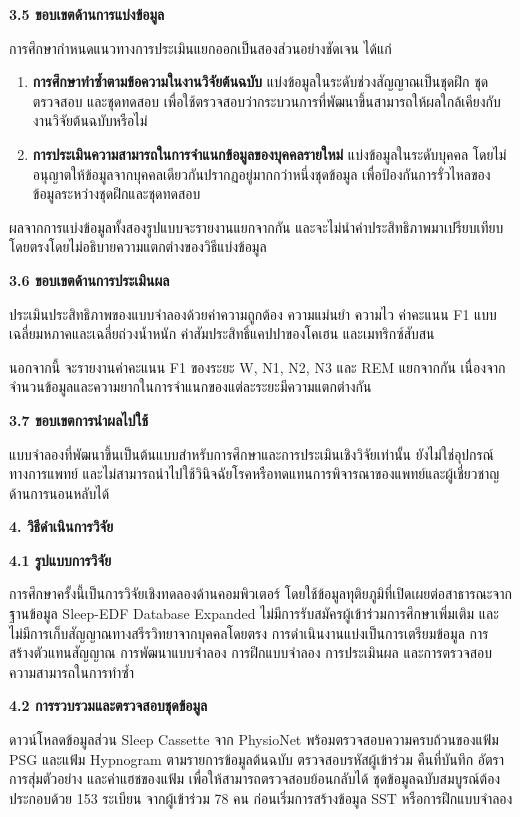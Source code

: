 \documentclass[12pt,a4paper]{article}
\newcommand{\mainsection}[1]{%
  \par\vspace{0.65\baselineskip}%
  \noindent\textbf{#1}\par\nobreak\vspace{0.2\baselineskip}%
}
\newcommand{\subsectionthai}[1]{%
  \par\vspace{0.35\baselineskip}%
  \noindent\textbf{#1}\par\nobreak\vspace{0.1\baselineskip}%
}
\begin{document}
\subsectionthai{3.5 ขอบเขตด้านการแบ่งข้อมูล}

การศึกษากำหนดแนวทางการประเมินแยกออกเป็นสองส่วนอย่างชัดเจน ได้แก่

\begin{enumerate}[label=\arabic*.]
  \item \textbf{การศึกษาทำซ้ำตามข้อความในงานวิจัยต้นฉบับ} แบ่งข้อมูลในระดับช่วงสัญญาณเป็นชุดฝึก ชุดตรวจสอบ และชุดทดสอบ เพื่อใช้ตรวจสอบว่ากระบวนการที่พัฒนาขึ้นสามารถให้ผลใกล้เคียงกับงานวิจัยต้นฉบับหรือไม่
  \item \textbf{การประเมินความสามารถในการจำแนกข้อมูลของบุคคลรายใหม่} แบ่งข้อมูลในระดับบุคคล โดยไม่อนุญาตให้ข้อมูลจากบุคคลเดียวกันปรากฏอยู่มากกว่าหนึ่งชุดข้อมูล เพื่อป้องกันการรั่วไหลของข้อมูลระหว่างชุดฝึกและชุดทดสอบ
\end{enumerate}

ผลจากการแบ่งข้อมูลทั้งสองรูปแบบจะรายงานแยกจากกัน และจะไม่นำค่าประสิทธิภาพมาเปรียบเทียบโดยตรงโดยไม่อธิบายความแตกต่างของวิธีแบ่งข้อมูล

\subsectionthai{3.6 ขอบเขตด้านการประเมินผล}

ประเมินประสิทธิภาพของแบบจำลองด้วยค่าความถูกต้อง ความแม่นยำ ความไว ค่าคะแนน F1 แบบเฉลี่ยมหภาคและเฉลี่ยถ่วงน้ำหนัก ค่าสัมประสิทธิ์แคปปาของโคเฮน และเมทริกซ์สับสน

นอกจากนี้ จะรายงานค่าคะแนน F1 ของระยะ W, N1, N2, N3 และ REM แยกจากกัน เนื่องจากจำนวนข้อมูลและความยากในการจำแนกของแต่ละระยะมีความแตกต่างกัน

\subsectionthai{3.7 ขอบเขตการนำผลไปใช้}

แบบจำลองที่พัฒนาขึ้นเป็นต้นแบบสำหรับการศึกษาและการประเมินเชิงวิจัยเท่านั้น ยังไม่ใช่อุปกรณ์ทางการแพทย์ และไม่สามารถนำไปใช้วินิจฉัยโรคหรือทดแทนการพิจารณาของแพทย์และผู้เชี่ยวชาญด้านการนอนหลับได้

\mainsection{4. วิธีดำเนินการวิจัย}

\subsectionthai{4.1 รูปแบบการวิจัย}

การศึกษาครั้งนี้เป็นการวิจัยเชิงทดลองด้านคอมพิวเตอร์ โดยใช้ข้อมูลทุติยภูมิที่เปิดเผยต่อสาธารณะจากฐานข้อมูล Sleep-EDF Database Expanded ไม่มีการรับสมัครผู้เข้าร่วมการศึกษาเพิ่มเติม และไม่มีการเก็บสัญญาณทางสรีรวิทยาจากบุคคลโดยตรง การดำเนินงานแบ่งเป็นการเตรียมข้อมูล การสร้างตัวแทนสัญญาณ การพัฒนาแบบจำลอง การฝึกแบบจำลอง การประเมินผล และการตรวจสอบความสามารถในการทำซ้ำ

\subsectionthai{4.2 การรวบรวมและตรวจสอบชุดข้อมูล}

ดาวน์โหลดข้อมูลส่วน Sleep Cassette จาก PhysioNet พร้อมตรวจสอบความครบถ้วนของแฟ้ม PSG และแฟ้ม Hypnogram ตามรายการข้อมูลต้นฉบับ ตรวจสอบรหัสผู้เข้าร่วม คืนที่บันทึก อัตราการสุ่มตัวอย่าง และค่าแฮชของแฟ้ม เพื่อให้สามารถตรวจสอบย้อนกลับได้ ชุดข้อมูลฉบับสมบูรณ์ต้องประกอบด้วย 153 ระเบียน จากผู้เข้าร่วม 78 คน ก่อนเริ่มการสร้างข้อมูล SST หรือการฝึกแบบจำลอง
\end{document}
